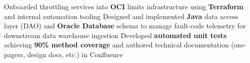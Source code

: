             {Onboarded throttling services into \textbf{OCI} limits infrastructure using \textbf{Terraform} and internal automation tooling} %
        \listItem{}
            {Designed and implemented \textbf{Java} data access layer (DAO) and \textbf{Oracle Database} schema to manage fault-code telemetry for downstream data warehouse ingestion}
        \listItem{}
            {Developed \textbf{automated unit tests} achieving \textbf{90\% method coverage} and authored technical documentation (one-pagers, design docs, etc.) in Confluence}
    \itemListEnd
    
